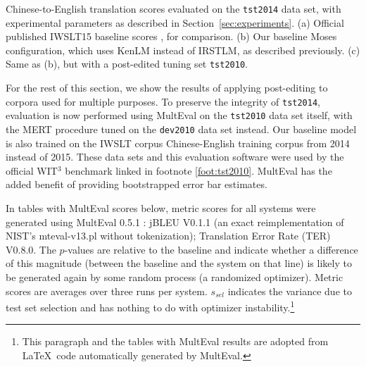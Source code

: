 {\begin{table}[ht]
\caption{ \label{tab:tst2010}
    Chinese-to-English translation scores evaluated on the {\small \tt tst2014} data set, with experimental parameters as described in Section~\ref{sec:experiments}. 
    (a) Official published IWSLT15 baseline scores , for comparison.
    (b) Our baseline Moses configuration, which uses KenLM instead of IRSTLM, as described previously.
    (c) Same as (b), but with a post-edited tuning set {\small \tt tst2010}. 
} %
\end{table}

For the rest of this section, we show the results of applying post-editing to corpora used for multiple purposes.
To preserve the integrity of {\small \tt tst2014}, evaluation is now performed using MultEval  on the {\small \tt tst2010} data set itself, with the MERT procedure tuned on the {\small \tt dev2010} data set instead.
Our baseline model is also trained on the IWSLT corpus Chinese-English training corpus from 2014 instead of 2015.
These data sets and this evaluation software were used by the official WIT$^3$ benchmark linked in footnote \ref{foot:tst2010}.
MultEval has the added benefit of providing bootstrapped error bar estimates.

In tables with MultEval scores below, metric scores for all systems were generated using MultEval 0.5.1 : jBLEU V0.1.1 (an exact reimplementation of NIST's mteval-v13.pl without tokenization); Translation Error Rate (TER) V0.8.0. 
The $p$-values are relative to the baseline and indicate whether a difference of this magnitude (between the baseline and the system on that line) is likely to be generated again by some random process (a randomized optimizer). 
Metric scores are averages over three runs per system. 
$s_{sel}$ indicates the variance due to test set selection and has nothing to do with optimizer instability.\footnote{
    This paragraph and the tables with MultEval results are adopted from \LaTeX~code automatically generated by MultEval.
}





















}
